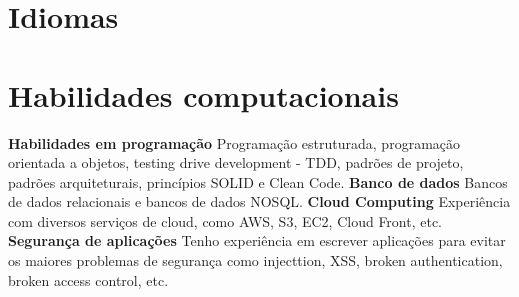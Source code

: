 \documentclass[12pt,a4paper,sans]{moderncv}        %
\begin{document}

\section{Idiomas}

\section{Habilidades computacionais}
\textbf{Habilidades em programação} Programação estruturada, programação orientada a objetos, testing drive development - TDD, padrões de projeto, padrões arquiteturais, princípios SOLID e Clean Code.\newline
\textbf{Banco de dados} Bancos de dados relacionais e bancos de dados NOSQL.\newline
\textbf{Cloud Computing} Experiência com diversos serviços de cloud, como AWS, S3, EC2, Cloud Front, etc.\newline
\textbf{Segurança de aplicações} Tenho experiência em escrever aplicações para evitar os maiores problemas de segurança como injecttion, XSS, broken authentication, broken access control, etc.\newline%
\end{document}
